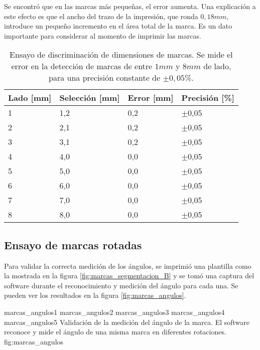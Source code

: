 Se encontró que en las marcas más pequeñas, el error aumenta. Una explicación a este efecto es que el ancho del trazo de la impresión, que ronda $0,18mm$, introduce un pequeño incremento en el área total de la marca. Es un dato importante para considerar al momento de imprimir las marcas.

      \begin{table}[!ht]
         \centering
         \caption[Ensayos de discriminación de dimensiones de marcas.]{Ensayo de discriminación de dimensiones de marcas. Se mide el error en la detección de marcas de entre $1mm$ y $8mm$ de lado, para una precisión constante de $\pm0,05$\%.}
         \begin{tabular}[!ht]{m{1.6cm}m{1.6cm}m{1.6cm}m{1.6cm}}
            \toprule
            \textbf{Lado [mm]} & \textbf{Selección [mm]} & \textbf{Error [mm]}& \textbf{Precisión [\%]}\\
            \midrule
            {1}& {1,2}& {0,2}& {$\pm$0,05}\\
            {2}& {2,1}& {0,2}& {$\pm$0,05}\\
            {3}& {3,1}& {0,2}& {$\pm$0,05}\\
            {4}& {4,0}& {0,0}& {$\pm$0,05}\\
            {5}& {5,0}& {0,0}& {$\pm$0,05}\\
            {6}& {6,0}& {0,0}& {$\pm$0,05}\\
            {7}& {7,0}& {0,0}& {$\pm$0,05}\\
            {8}& {8,0}& {0,0}& {$\pm$0,05}\\
            \bottomrule
         \end{tabular}
         \label{tbl:marcas_dimensiones}
      \end{table}

\subsection{Ensayo de marcas rotadas}

Para validar la correcta medición de los ángulos, se imprimió una plantilla como la mostrada en la figura \ref{fig:marcas_segmentacion_B} y se tomó una captura del software durante el reconocimiento y medición del ángulo para cada una. Se pueden ver los resultados en la figura \ref{fig:marcas_angulos}.

\subfigthreetwo
   {marcas_angulos1}
   {marcas_angulos2}
   {marcas_angulos3}
   {marcas_angulos4}
   {marcas_angulos5}
   {Validación de la medición del ángulo de la marca. El software reconoce y mide el ángulo de una misma marca en diferentes rotaciones.}
   {fig:marcas_angulos}

